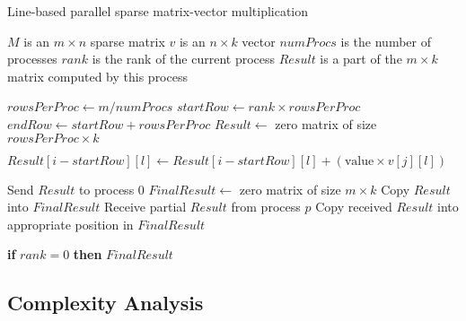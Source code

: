 \documentclass[12pt,oneside]{book} %
\begin{document}
\begin{algorithm}[H]
    \caption{Line-based parallel sparse matrix-vector multiplication}
    \begin{algorithmic}
        \Require $M$ is an $m \times n$ sparse matrix
        \Require $v$ is an $n \times k$ vector
        \Require $numProcs$ is the number of processes
        \Require $rank$ is the rank of the current process
        \Ensure  $Result$ is a part of the $m \times k$ matrix computed by this process

        \State $rowsPerProc \gets m / numProcs$
        \State $startRow \gets rank \times rowsPerProc$
        \State $endRow \gets startRow + rowsPerProc$
        \State $Result \gets$ zero matrix of size $rowsPerProc \times k$

        \State $Result[i - startRow][l] \gets Result[i - startRow][l] + (\text{value} \times v[j][l])$
        \EndFor
        \EndFor
        \EndFor

        \State Send $Result$ to process $0$
        \Else
        \State $FinalResult \gets$ zero matrix of size $m \times k$
        \State Copy $Result$ into $FinalResult$
        \State Receive partial $Result$ from process $p$
        \State Copy received $Result$ into appropriate position in $FinalResult$
        \EndFor
        \EndIf

        \State \textbf{if} $rank = 0$ \textbf{then} \Return $FinalResult$
    \end{algorithmic}
\end{algorithm}

\subsection{Complexity Analysis}
\end{document}
